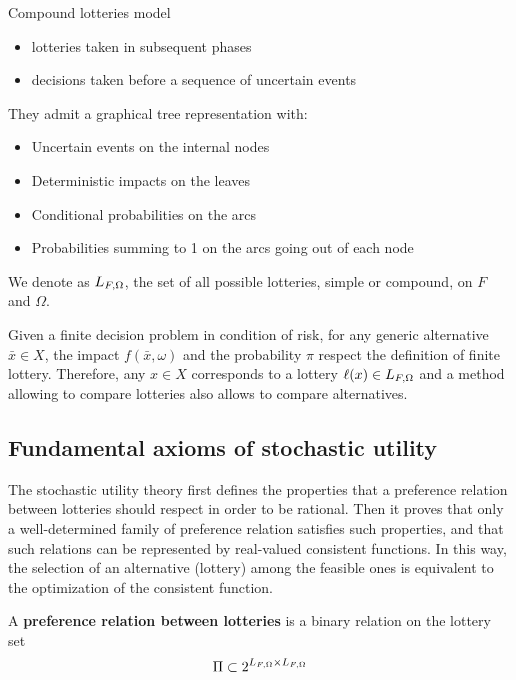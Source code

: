 Compound lotteries model
\begin{itemize}
	\item lotteries taken in subsequent phases
	
	\item decisions taken before a sequence of uncertain events
\end{itemize}

They admit a graphical tree representation with:
\begin{itemize}
	\item Uncertain events on the internal nodes
	
	\item Deterministic impacts on the leaves
	
	\item Conditional probabilities on the arcs
	
	\item Probabilities summing to 1 on the arcs going out of each node \\
\end{itemize}

\begin{definition}
	We denote as $L_{F, \Omega}$, the set of all possible lotteries, simple or compound, on $F$ and $\Omega$.
\end{definition}

Given a finite decision problem in condition of risk, for any generic alternative $\bar x \in X$, the impact $f(\bar x, \omega)$ and the probability $\pi$ respect the definition of finite lottery. Therefore, any $x \in X$ corresponds to a lottery $\ell (x) \in L_{F, \Omega}$ and a method allowing to compare lotteries also allows to compare alternatives.

\subsection{Fundamental axioms of stochastic utility}

The stochastic utility theory first defines the properties that a preference relation between lotteries should respect in order to be rational. Then it proves that only a well-determined family of preference relation satisfies such properties, and that such relations can be represented by real-valued consistent functions. In this way, the selection of an alternative (lottery) among the feasible ones is equivalent to the optimization of the consistent function. \\

\begin{definition}
	A \textbf{preference relation between lotteries} is a binary relation on the lottery set
	$$ \Pi  \subset 2^{L_{F, \Omega} \times L_{F, \Omega}} $$
\end{definition}

